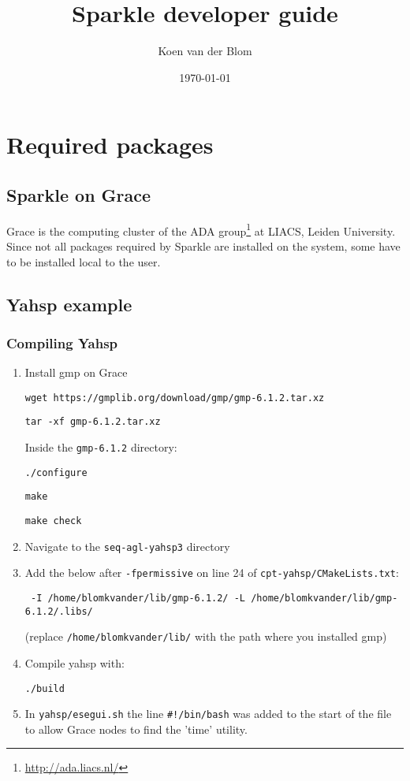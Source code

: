 \documentclass{article}
\title{Sparkle developer guide}
\author{Koen van der Blom}
\date{\today}
\begin{document}
\maketitle

\section{Required packages}

\subsection{Sparkle on Grace}

Grace is the computing cluster of the ADA group\footnote{\url{http://ada.liacs.nl/}} at LIACS, Leiden University. Since not all packages required by Sparkle are installed on the system, some have to be installed local to the user.

\subsection{Yahsp example}

\subsubsection{Compiling Yahsp}


\begin{enumerate}

  \item Install gmp on Grace

  \texttt{wget https://gmplib.org/download/gmp/gmp-6.1.2.tar.xz}

  \texttt{tar -xf gmp-6.1.2.tar.xz}

  Inside the \texttt{gmp-6.1.2} directory:

  \texttt{./configure}

  \texttt{make}

  \texttt{make check}

  \item Navigate to the \texttt{seq-agl-yahsp3} directory

  \item Add the below after \texttt{-fpermissive} on line 24 of \texttt{cpt-yahsp/CMakeLists.txt}:

  \texttt{ -I /home/blomkvander/lib/gmp-6.1.2/ -L /home/blomkvander/lib/gmp-6.1.2/.libs/}

  (replace \texttt{/home/blomkvander/lib/} with the path where you installed gmp)

  \item Compile yahsp with:

  \texttt{./build}

  \item In \texttt{yahsp/esegui.sh} the line \texttt{\#!/bin/bash} was added to the start of the file to allow Grace nodes to find the 'time' utility.

\end{enumerate}
\end{document}
